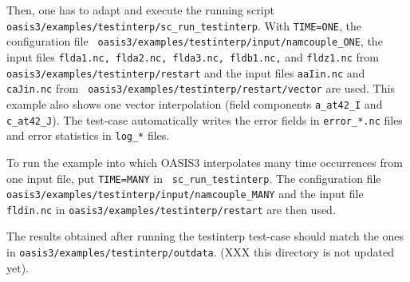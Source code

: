 Then, one has to adapt and execute the running script {\tt
  oasis3/examples/testinterp/\break sc\_run\_testinterp}.
With {\tt TIME=ONE}, the configuration file {\tt
  oasis3/examples/testinterp/\break input/namcouple\_ONE}, the input files
{\tt flda1.nc, flda2.nc, flda3.nc, fldb1.nc,} 
and {\tt fldz1.nc} from {\tt oasis3/examples/testinterp/restart} and the
input files {\tt aaIin.nc} and {\tt caJin.nc} from {\tt
  oasis3/examples/testinterp/restart/vector} are used.  This example also
shows one vector interpolation (field components {\tt a\_at42\_I} and
{\tt c\_at42\_J}).  The test-case automatically writes the error
fields in {\tt error\_*.nc} files and error statistics in {\tt log\_*}
files.

To run the example into which OASIS3 interpolates many time
occurrences from one input file, put {\tt TIME=MANY} in {\tt
  sc\_run\_testinterp}.  The configuration file {\tt
  oasis3/examples/testinterp/\break input/namcouple\_MANY} and the input
file {\tt fldin.nc} in {\tt oasis3/examples/testinterp/\break restart} are then
used.

The results obtained after running the testinterp test-case should
match the ones in {\tt oasis3/examples/\break testinterp/outdata}.
(XXX this directory is not updated yet).

